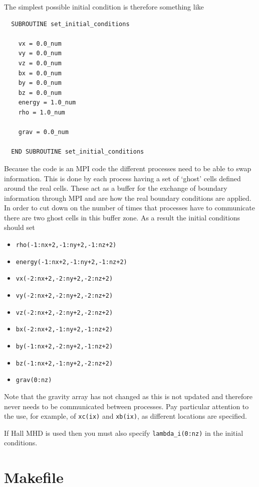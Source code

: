 \documentclass[11pt]{article}
\begin{document}
The simplest possible initial condition is therefore something like
\begin{verbatim}
  SUBROUTINE set_initial_conditions

    vx = 0.0_num
    vy = 0.0_num
    vz = 0.0_num
    bx = 0.0_num
    by = 0.0_num
    bz = 0.0_num
    energy = 1.0_num
    rho = 1.0_num

    grav = 0.0_num

  END SUBROUTINE set_initial_conditions
\end{verbatim}



Because the code is an MPI code the different processes need to be able to swap information. This is done by each process having a set of `ghost' cells defined around the real cells. These act as a buffer for the exchange of boundary information through MPI and are how the real boundary conditions are applied. In order to cut down on the number of times that processes have to communicate there are two ghost cells in this buffer zone. As a result the initial conditions should set
\begin{itemize}
\item \texttt{rho(-1:nx+2,-1:ny+2,-1:nz+2)}
\item \texttt{energy(-1:nx+2,-1:ny+2,-1:nz+2)}
\item \texttt{vx(-2:nx+2,-2:ny+2,-2:nz+2)}
\item \texttt{vy(-2:nx+2,-2:ny+2,-2:nz+2)}
\item \texttt{vz(-2:nx+2,-2:ny+2,-2:nz+2)}
\item \texttt{bx(-2:nx+2,-1:ny+2,-1:nz+2)}
\item \texttt{by(-1:nx+2,-2:ny+2,-1:nz+2)}
\item \texttt{bz(-1:nx+2,-1:ny+2,-2:nz+2)}
\item \texttt{grav(0:nz)}
\end{itemize}
Note that the gravity array has not changed as this is not updated and therefore never needs to be communicated between processes.  Pay particular attention to the use, for example, of \texttt{xc(ix)} and \texttt{xb(ix)}, as different locations are specified.

If Hall MHD is used then you must also specify \texttt{lambda\_i(0:nz)} in the initial conditions.

\section{Makefile}
\end{document}
